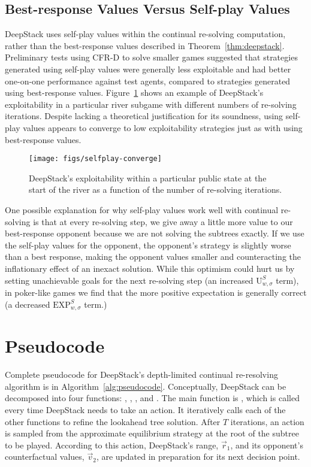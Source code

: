 \subsection*{Best-response Values Versus Self-play Values}
DeepStack uses self-play values within the continual re-solving
computation, rather than the best-response values described in
Theorem~\ref{thm:deepstack}. Preliminary tests using CFR-D to solve
smaller games suggested that strategies generated using self-play
values were generally less exploitable and had better one-on-one
performance against test agents, compared to strategies generated
using best-response values.  Figure~\ref{fig:selfplay-converge} shows
an example of DeepStack's exploitability in a particular river subgame 
with different numbers of re-solving iterations.  Despite lacking
a theoretical justification for its soundness, using self-play values appears
to converge to low exploitability strategies just as with using best-response values.

\begin{figure}[t]
\centering
\texttt{[image: figs/selfplay-converge]}
\caption{DeepStack's exploitability within a particular public state at the start of the river as a function of the number of re-solving iterations.}\label{fig:selfplay-converge}
\end{figure}

One possible explanation for why self-play values work well with
continual re-solving is that at every re-solving step, we give away a
little more value to our best-response opponent because we are not
solving the subtrees exactly. If we use the self-play values for the
opponent, the opponent's strategy is slightly worse than a best
response, making the opponent values smaller and
counteracting the inflationary effect of an inexact solution.  
While this optimism could hurt us by setting unachievable
goals for the next re-solving step (an increased
$\text{U}^S_{w,\sigma}$ term), in poker-like games we find that the
more positive expectation is generally correct (a decreased
$\text{EXP}^S_{w,\sigma}$ term.)

\section*{Pseudocode}
Complete pseudocode for DeepStack's depth-limited continual re-resolving algorithm is in Algorithm~\ref{alg:pseudocode}.  Conceptually, DeepStack can be decomposed into four functions: , , , and . The main function is , which is called every time DeepStack needs to take an action. It iteratively calls each of the other functions to refine the lookahead tree solution. After $T$ iterations, an action is sampled from the approximate equilibrium strategy at the root of the subtree to be played. 
According to this action, DeepStack's range, $\vec{r}_1$, and its opponent's counterfactual values, $\vec{v}_2$, are updated in preparation for its next decision point.

